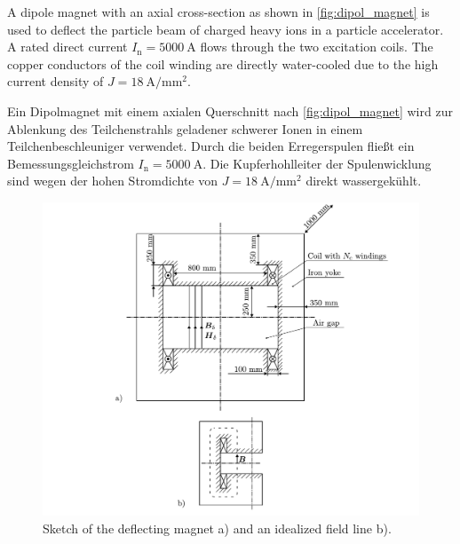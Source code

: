 
A dipole magnet with an axial cross-section as shown in \autoref{fig:dipol_magnet} is used to deflect the particle beam of charged heavy ions in a particle accelerator. A rated direct current $I_{\mathrm{n}} = \SI{5000}{\ampere}$ flows through the two excitation coils. The copper conductors of the coil winding are directly water-cooled due to the high current density of $J = \SI{18}{\ampere\per\milli\metre^2}$.

\begin{germanblock}
    Ein Dipolmagnet mit einem axialen Querschnitt nach \autoref{fig:dipol_magnet} wird zur Ablenkung des Teilchenstrahls geladener schwerer Ionen in einem Teilchenbeschleuniger verwendet. Durch die beiden Erregerspulen fließt ein Bemessungsgleichstrom $I_{\mathrm{n}} = \SI{5000}{\ampere}$. Die Kupferhohlleiter der Spulenwicklung sind wegen der hohen Stromdichte von $J = \SI{18}{\ampere\per\milli\metre^2}$ direkt wassergekühlt.
\end{germanblock}

\begin{figure}[h!]
    \centering
    \includegraphics{fig/sketch_dipol_magnet.pdf}
    \caption{Sketch of the deflecting magnet a) and an idealized field line b).}
    \label{fig:dipol_magnet}
\end{figure}



